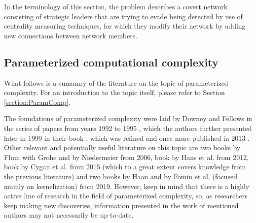 In the terminology of this section, the \HL problem describes a covert network consisting of strategic leaders
that are trying to evade being detected by use of centrality measuring techniques,
for which they modify their network by adding new connections between network members. 

\subsection{Parameterized computational complexity}

What follows is a sumamry of the literature on the topic of parameterized complexity.
For an introduction to the topic itself, please refer to Section \ref{section:ParamComp}.

The foundations of parameterized complexity were laid by Downey and Fellows
in the series of papers from years 1992 to 1995 \cite{Downey1992,Downey1995.1,Downey1995.2,Downey1993,Downey1995.4},
which the authors further presented later in 1999 in their book \cite{Downey1999},
which was refined and once more published in 2013 \cite{Downey2013}.
Other relevant and potentially useful literature on this topic are
two books by Flum with Grohe \cite{Flum2006} and by Niedermeier \cite{Niedermeier2006} from 2006, book by Hans et al. \cite{Hans2012} from 2012,
book by Cygan et al. \cite{Cygan2015} from 2015 (which to a great extent covers knowledge from the previous literature)
and two books by Haan \cite{Haan2019} and by Fomin et al. (focused mainly on kernelization) \cite{Fomin2019} from 2019.
However, keep in mind that there is a highly active line of research in the field of parameterized complexity, so,
as researchers keep making new discoveries, information presented in the work of mentioned authors may not necessarily be up-to-date.
